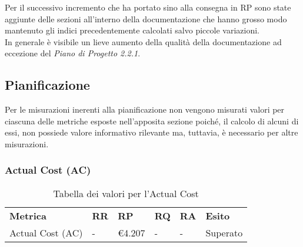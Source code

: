 \noindent Per il successivo incremento che ha portato sino alla consegna in RP sono state aggiunte delle sezioni all'interno della documentazione che hanno grosso modo mantenuto gli indici precedentemente calcolati salvo piccole variazioni.\\

\noindent In generale è visibile un lieve aumento della qualità della documentazione ad eccezione del \textit{Piano di Progetto 2.2.1\docs}.



\newpage
\subsection{Pianificazione}
Per le misurazioni inerenti alla pianificazione non vengono misurati valori per ciascuna delle metriche esposte nell'apposita sezione poiché, il calcolo di alcuni di essi, non possiede valore informativo rilevante ma, tuttavia, è necessario per altre misurazioni.

\subsubsection{Actual Cost (AC)}
\renewcommand{\arraystretch}{2.2}
\begin{longtable}{|C{4.5cm}|C{1.5cm}|C{1.5cm}|C{1.5cm}|C{1.5cm}|C{1.5cm}|}

	\caption{Tabella dei valori per l'Actual Cost}\\
	\hline

	\textbf{Metrica} & \textbf{RR}  & \textbf{RP} & \textbf{RQ} & \textbf{RA} & \textbf{Esito}
	\tabularnewline
	\endfirsthead

	Actual Cost (AC) & -  & \euro4.207	 & - & - & Superato
\end{longtable}
\begin{center}
\end{center}

